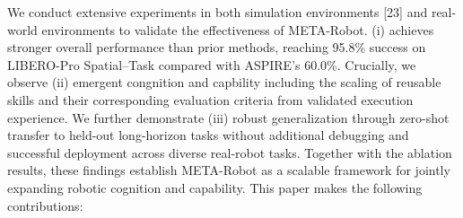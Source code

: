 \documentclass{article} %
\begin{document}
We conduct extensive experiments in both simulation environments [23] and real-world environments
to validate the effectiveness of META-Robot. (i) achieves stronger overall performance than prior methods, reaching 95.8\% success on LIBERO-Pro Spatial--Task compared with ASPIRE's 60.0\%. Crucially, we observe (ii) emergent congnition and capbility including the scaling of reusable skills and their corresponding evaluation criteria from validated execution experience. We further demonstrate (iii) robust generalization through zero-shot transfer to held-out long-horizon tasks without additional debugging and successful deployment across diverse real-robot tasks. Together with the ablation results, these findings establish META-Robot as a scalable framework for jointly expanding robotic cognition and capability. This paper makes the following contributions:



\end{document}
